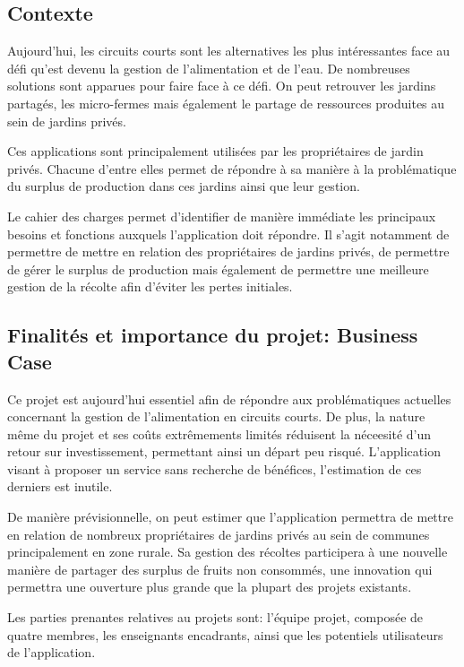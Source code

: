 \documentclass{article}
\begin{document}
\subsection{Contexte}

Aujourd'hui, les circuits courts sont les alternatives les plus intéressantes face au défi qu'est devenu la gestion de l'alimentation et de l'eau. De nombreuses solutions sont apparues pour faire face à ce défi. On peut retrouver les jardins partagés, les micro-fermes mais également le partage de ressources produites au sein de jardins privés. 

Ces applications sont principalement utilisées par les propriétaires de jardin privés. Chacune d'entre elles permet de répondre à sa manière à la problématique du surplus de production dans ces jardins ainsi que leur gestion.

Le cahier des charges permet d'identifier de manière immédiate les principaux besoins et fonctions auxquels l'application doit répondre. Il s'agit notamment de permettre de mettre en relation des propriétaires de jardins privés, de permettre de gérer le surplus de production mais également de permettre une meilleure gestion de la récolte afin d'éviter les pertes initiales.


\subsection{Finalités et importance du projet: Business Case}

Ce projet est aujourd'hui essentiel afin de répondre aux problématiques actuelles concernant la gestion de l'alimentation en circuits courts. De plus, la nature même du projet et ses coûts extrêmements limités réduisent la néceesité d'un retour sur investissement, permettant ainsi un départ peu risqué. L'application visant à proposer un service sans recherche de bénéfices, l'estimation de ces derniers est inutile.

De manière prévisionnelle, on peut estimer que l'application permettra de mettre en relation de nombreux propriétaires de jardins privés au sein de communes principalement en zone rurale. Sa gestion des récoltes participera à une nouvelle manière de partager des surplus de fruits non consommés, une innovation qui permettra une ouverture plus grande que la plupart des projets existants.

\vspace{4mm}

Les parties prenantes relatives au projets sont: l'équipe projet, composée de quatre membres, les enseignants encadrants, ainsi que les potentiels utilisateurs de l'application.
\end{document}
